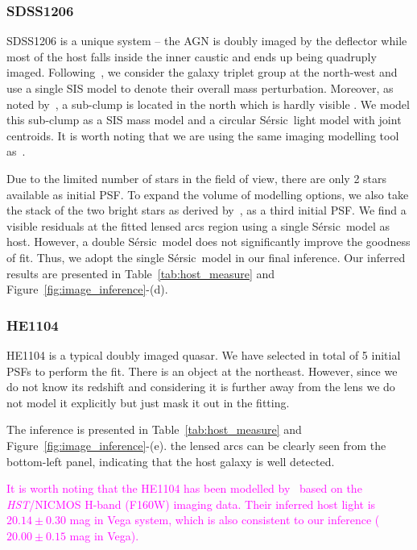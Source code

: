 \documentclass[fleqn,usenatbib]{mnras}
\newcommand{\hst}{{\it HST}}
\newcommand{\sersic}{S\'ersic}
\newcommand{\pink}[1]{{\textcolor{magenta}{#1}}}
\begin{document}
\subsubsection{SDSS1206}
SDSS1206 is a unique system -- the AGN is doubly imaged by the deflector while most of the host falls inside the inner caustic and ends up being quadruply imaged. Following~\citet{Birrer2019}, we consider the galaxy triplet group at the north-west and use a single SIS model to denote their overall mass perturbation. Moreover, as noted by~\citet{Birrer2019}, a sub-clump is located in the north which is hardly visible \citep[see Figure~1 in][]{Birrer2019}. We model this sub-clump as a SIS mass model and a circular \sersic\ light model with joint centroids. It is worth noting that we are using the same imaging modelling tool as~\citet{Birrer2019}.

Due to the limited number of stars in the field of view, there are only 2 stars available as initial PSF. To expand the volume of modelling options, we also take the stack of the two bright stars as derived by~\citet{Birrer2019}, as a third initial PSF. We find a visible residuals at the fitted lensed arcs region using a single \sersic\ model as host. However, a double \sersic\ model does not significantly improve the goodness of fit. Thus, we adopt the single \sersic\ model in our final inference. Our inferred results are presented in Table~\ref{tab:host_measure} and Figure~\ref{fig:image_inference}-(d).


\subsubsection{HE1104}
HE1104 is a typical doubly imaged quasar. We have selected in total of 5 initial PSFs to perform the fit. There is an object at the northeast. However, since we do not know its redshift and considering it is further away from the lens we do not model it explicitly but just mask it out in the fitting.

The inference is presented in Table~\ref{tab:host_measure} and Figure~\ref{fig:image_inference}-(e). the lensed arcs can be clearly seen from the bottom-left panel, indicating that the host galaxy is well detected.

\pink{It is worth noting that the HE1104 has been modelled by~\citet{Peng2006} based on the \hst/NICMOS H-band (F160W) imaging data. Their inferred host light is $20.14\pm0.30$ mag in Vega system, which is also consistent to our inference ($20.00\pm0.15$ mag in Vega).}
\end{document}
